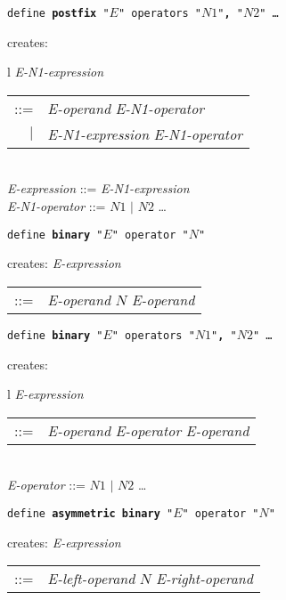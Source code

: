 \documentclass[12pt]{article}
\newcommand{\TT}[1]{{\tt \bfseries #1}}
\newenvironment{indpar}[1][0.3in]%
	{\begin{list}{}%
		     {\setlength{\itemsep}{0in}%
		      \setlength{\topsep}{0in}%
		      \setlength{\parsep}{1ex}%
		      \setlength{\labelwidth}{#1}%
		      \setlength{\leftmargin}{#1}%
		      \addtolength{\leftmargin}{\labelsep}}%
	 \item}%
	{\end{list}}
\begin{document}
\begin{indpar}
{\tt define \TT{postfix} "$E$" operators "$N1$"\TT{,} "$N2$" \ldots}
\begin{indpar}
creates: \begin{tabular}[t]{l}
         {\em E-N1-expression} \begin{tabular}[t]{rl}
                            ::= & {\em E-operand} {\em E-N1-operator} \\
                            $|$ & {\em E-N1-expression} {\em E-N1-operator} \\
                            \end{tabular} \\
         {\em E-expression} ::= {\em E-N1-expression} \\
         {\em E-N1-operator} ::= $N1$ $|$ $N2$ \ldots \\
	 \end{tabular}
\end{indpar}

{\tt define \TT{binary} "$E$" operator "$N$"}
\begin{indpar}
creates: {\em E-expression} \begin{tabular}[t]{rl}
                            ::= & {\em E-operand} $N$ {\em E-operand} \\
                            \end{tabular}
\end{indpar}

{\tt define \TT{binary} "$E$" operators "$N1$"\TT{,} "$N2$" \ldots}
\begin{indpar}
creates: \begin{tabular}[t]{l}
         {\em E-expression} \begin{tabular}[t]{rl}
                            ::= & {\em E-operand} {\em E-operator}
			          {\em E-operand} \\
                            \end{tabular} \\
         {\em E-operator} ::= $N1$ $|$ $N2$ \ldots \\
	 \end{tabular}
\end{indpar}

{\tt define \TT{asymmetric binary} "$E$" operator "$N$"}
\begin{indpar}
creates: {\em E-expression} \begin{tabular}[t]{rl}
                            ::= & {\em E-left-operand} $N$
			          {\em E-right-operand} \\
                            \end{tabular}
\end{indpar}


\end{indpar}
\end{document}
